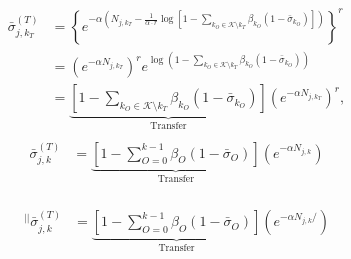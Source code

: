 
\begin{align}
	\begin{split}
		\bar{\sigma}^{(T)}_{j,k_T} &= \left\{ e^{-\alpha \left(N_{j,k_T} - \frac{1}{\alpha \cdot r}  \log\left[ 1- \sum\limits_{k_O\in \mathcal{K} \setminus k_T}\beta_{k_O}\left(1 - \bar{\sigma}_{k_O}\right) \right] \right)}\right\}^r\\
		&= \left(e^{-\alpha {N_{j,k_T}}} \right)^r e^{ \log\left( 1-\sum\limits_{k_O \in \mathcal{K} \setminus k_T}\beta_{k_O}\left(1 - \bar{\sigma}_{k_O}\right) \right) }\\
		&= \underbrace{\left[1- \sum\limits_{k_O \in \mathcal{K} \setminus k_T}\beta_{k_O} \left( 1 - \bar{\sigma}_{k_O} \right)\right]}_{\text{Transfer}} \left(e^{-\alpha N_{j,k_T}} \right)^r ,
	\end{split}
\end{align}
\begin{align}
	\begin{split}
		\bar{\sigma}^{(T)}_{j,k} 
		&= \underbrace{\left[1- \sum\limits_{O = 0}^{k-1}\beta_{O} \left( 1 - \bar{\sigma}_{O} \right)\right]}_{\text{Transfer}} \left(e^{-\alpha N_{j,k}} \right)
	\end{split}
\end{align}

\begin{align}
	\begin{split}
		^{\lvert \lvert}\bar{\sigma}^{(T)}_{j,k} 
		&= \underbrace{\left[1- \sum\limits_{O = 0}^{k-1}\beta_{O} \left( 1 - \bar{\sigma}_{O} \right)\right]}_{\text{Transfer}} \left(e^{-\alpha N_{j,k}/} \right)
	\end{split}
\end{align}

